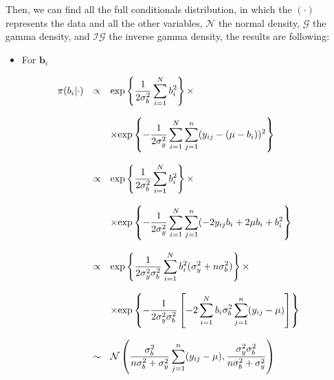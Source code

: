 \documentclass{asaproc}
\begin{document}
Then, we can find all the full conditionals distribution, in which the $(\cdot)$ represents the data and all the other variables, $\mathcal{N}$ the normal density, $\mathcal{G}$ the gamma density, and $\mathcal{IG}$ the inverse gamma density, the results are following:

\begin{itemize}
\item For $\boldsymbol{b}_i$
\end{itemize}

\vfill

\begin{small}
\begin{eqnarray*}
\begin{array}{lcl ll }
\pi(b_i|\cdot) & \propto & \mbox{exp}\left\{ \dfrac{1}{2\sigma_b^2}\displaystyle\sum_{i=1}^{N} b_i^2 \right\} \times \\ \\
& &  \times \mbox{exp}\left\{ -\dfrac{1}{2\sigma_y^2}\displaystyle\sum_{i=1}^{N}\displaystyle\sum_{j=1}^{n}(y_{ij} - (\mu - b_i))^2\right\}\\ \\

& \propto & \mbox{exp}\left\{ \dfrac{1}{2\sigma_b^2}\displaystyle\sum_{i=1}^{N} b_i^2 \right\} \times \\ \\
& & \times \mbox{exp}\left\{ -\dfrac{1}{2\sigma_y^2}\displaystyle\sum_{i=1}^{N}\displaystyle\sum_{j=1}^{n}( - 2y_{ij}b_i  + 2\mu b_i +  b_i^2\right\}\\ \\

& \propto & \mbox{exp}\left\{ \dfrac{1}{2\sigma_y^2\sigma_b^2}\displaystyle\sum_{i=1}^{N} b_i^2 (\sigma_y^2 + n\sigma_b^2)\right\} \times \\ \\
& & \times  \mbox{exp}\left\{ -\dfrac{1}{2\sigma_y^2\sigma_b^2}\left[ -2\displaystyle\sum_{i=1}^{N}b_i\sigma_b^2\displaystyle\sum_{j=1}^{n}(y_{ij} - \mu)\right]\right\}\\ \\

& \sim & \mathcal{N}\left( \dfrac{\sigma_b^2}{n\sigma_b^2 + \sigma_y^2} \displaystyle\sum_{j=1}^{n} (y_{ij} - \mu) , \dfrac{\sigma_y^2\sigma_b^2}{n\sigma_b^2 + \sigma_y^2} \right) \\

\end{array}
\end{eqnarray*}
\end{small}
\end{document}

